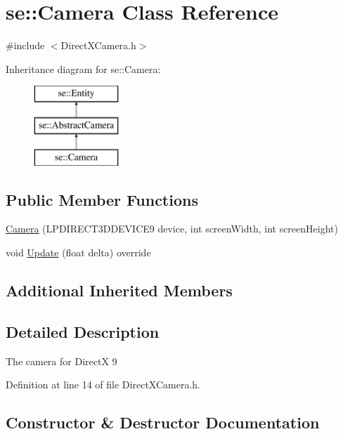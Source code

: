 \hypertarget{classse_1_1_camera}{}\section{se\+:\+:Camera Class Reference}
\label{classse_1_1_camera}


{\ttfamily \#include $<$Direct\+X\+Camera.\+h$>$}

Inheritance diagram for se\+:\+:Camera\+:\begin{figure}[H]
\begin{center}
\leavevmode
\includegraphics[height=3.000000cm]{classse_1_1_camera}
\end{center}
\end{figure}
\subsection*{Public Member Functions}
\begin{DoxyCompactItemize}
\item 
\mbox{\hyperlink{classse_1_1_camera_a739a31b067cd3b702209e6a778b29db1}{Camera}} (L\+P\+D\+I\+R\+E\+C\+T3\+D\+D\+E\+V\+I\+C\+E9 device, int screen\+Width, int screen\+Height)
\item 
void \mbox{\hyperlink{classse_1_1_camera_abecf2d50dc793707a475b35bb487812c}{Update}} (float delta) override
\end{DoxyCompactItemize}
\subsection*{Additional Inherited Members}


\subsection{Detailed Description}
The camera for DirectX 9 

Definition at line 14 of file Direct\+X\+Camera.\+h.



\subsection{Constructor \& Destructor Documentation}
\mbox{\label{classse_1_1_camera_a739a31b067cd3b702209e6a778b29db1}} 
